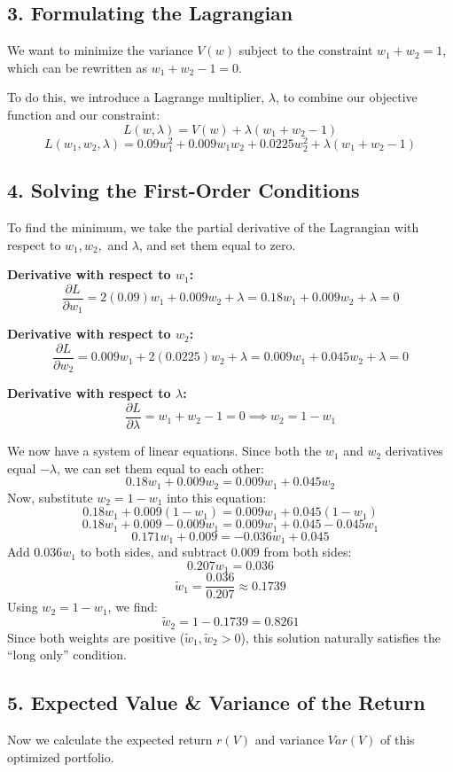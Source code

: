 \subsection*{3. Formulating the Lagrangian}
We want to minimize the variance $V(w)$ subject to the constraint $w_1 + w_2 = 1$, which can be rewritten as $w_1 + w_2 - 1 = 0$. 

To do this, we introduce a Lagrange multiplier, $\lambda$, to combine our objective function and our constraint:
\[
L(w, \lambda) = V(w) + \lambda(w_1 + w_2 - 1)
\]
\[
L(w_1, w_2, \lambda) = 0.09w_1^2 + 0.009w_1w_2 + 0.0225w_2^2 + \lambda(w_1 + w_2 - 1)
\]

\subsection*{4. Solving the First-Order Conditions}
To find the minimum, we take the partial derivative of the Lagrangian with respect to $w_1, w_2,$ and $\lambda$, and set them equal to zero.

\vspace{0.5em}
\noindent \textbf{Derivative with respect to $w_1$:}
\[
\frac{\partial L}{\partial w_1} = 2(0.09)w_1 + 0.009w_2 + \lambda = 0.18w_1 + 0.009w_2 + \lambda = 0
\]

\noindent \textbf{Derivative with respect to $w_2$:}
\[
\frac{\partial L}{\partial w_2} = 0.009w_1 + 2(0.0225)w_2 + \lambda = 0.009w_1 + 0.045w_2 + \lambda = 0
\]

\noindent \textbf{Derivative with respect to $\lambda$:}
\[
\frac{\partial L}{\partial \lambda} = w_1 + w_2 - 1 = 0 \implies w_2 = 1 - w_1
\]

We now have a system of linear equations. Since both the $w_1$ and $w_2$ derivatives equal $-\lambda$, we can set them equal to each other:
\[
0.18w_1 + 0.009w_2 = 0.009w_1 + 0.045w_2
\]
Now, substitute $w_2 = 1 - w_1$ into this equation:
\[
0.18w_1 + 0.009(1 - w_1) = 0.009w_1 + 0.045(1 - w_1)
\]
\[
0.18w_1 + 0.009 - 0.009w_1 = 0.009w_1 + 0.045 - 0.045w_1
\]
\[
0.171w_1 + 0.009 = -0.036w_1 + 0.045
\]
Add $0.036w_1$ to both sides, and subtract $0.009$ from both sides:
\[
0.207w_1 = 0.036
\]
\[
\tilde{w}_1 = \frac{0.036}{0.207} \approx 0.1739
\]
Using $w_2 = 1 - w_1$, we find:
\[
\tilde{w}_2 = 1 - 0.1739 = 0.8261
\]
Since both weights are positive ($\tilde{w}_1, \tilde{w}_2 > 0$), this solution naturally satisfies the ``long only'' condition.

\subsection*{5. Expected Value \& Variance of the Return}
Now we calculate the expected return $r(V)$ and variance $Var(V)$ of this optimized portfolio.

